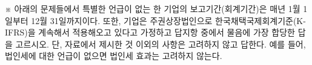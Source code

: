 \begin{framedtext}
※ 아래의 문제들에서 특별한 언급이 없는 한 기업의 보고기간(회계기간)은 매년 1월 1일부터 12월 31일까지이다. 또한, 기업은 주권상장법인으로 한국채택국제회계기준(K-IFRS)을 계속해서 적용해오고 있다고 가정하고 답지항 중에서 물음에 가장 합당한 답을 고르시오. 단, 자료에서 제시한 것 이외의 사항은 고려하지 않고 답한다. 예를 들어, 법인세에 대한 언급이 없으면 법인세 효과는 고려하지 않는다. \par
\end{framedtext}
